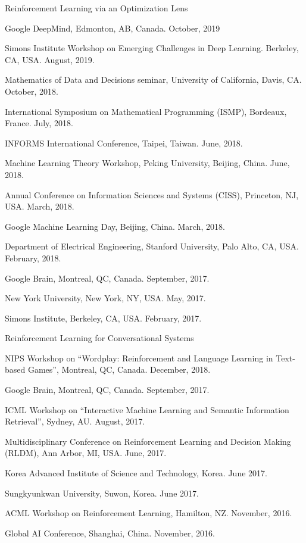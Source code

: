 \documentclass[10pt,twoside,letterpaper]{article}
\begin{document}
\begin{compactitem}

\item{ Reinforcement Learning via an Optimization Lens}
\begin{compactitem}
\item{Google DeepMind, Edmonton, AB, Canada.  October, 2019}
\item{Simons Institute Workshop on Emerging Challenges in Deep Learning.  Berkeley, CA, USA.  August, 2019.}
\item{Mathematics of Data and Decisions seminar, University of California, Davis, CA.  October, 2018.}
\item{International Symposium on Mathematical Programming (ISMP), Bordeaux, France. July, 2018.}
\item{INFORMS International Conference, Taipei, Taiwan. June, 2018.}
\item{Machine Learning Theory Workshop, Peking University, Beijing, China.  June, 2018.}
\item{Annual Conference on Information Sciences and Systems (CISS), Princeton, NJ, USA. March, 2018.}
\item{Google Machine Learning Day, Beijing, China. March, 2018.}
\item{Department of Electrical Engineering, Stanford University, Palo Alto, CA, USA. February, 2018.}
\item{Google Brain, Montreal, QC, Canada.  September, 2017.}
\item{New York University, New York, NY, USA.  May, 2017.}
\item{Simons Institute, Berkeley, CA, USA.  February, 2017.}
\end{compactitem}

\item{Reinforcement Learning for Conversational Systems}
\begin{compactitem}
\item{NIPS Workshop on ``Wordplay: Reinforcement and Language Learning in Text-based Games'', Montreal, QC, Canada.  December, 2018.}
\item{Google Brain, Montreal, QC, Canada.  September, 2017.}
\item{ICML Workshop on ``Interactive Machine Learning and Semantic Information Retrieval'', Sydney, AU.  August, 2017.}
\item{Multidisciplinary Conference on Reinforcement Learning and Decision Making (RLDM), Ann Arbor, MI, USA.  June, 2017.}
\item{Korea Advanced Institute of Science and Technology, Korea. June 2017.}
\item{Sungkyunkwan University, Suwon, Korea. June 2017.}
\item{ACML Workshop on Reinforcement Learning, Hamilton, NZ.  November, 2016.}
\item{Global AI Conference, Shanghai, China.  November, 2016.}
\end{compactitem}


\end{compactitem}
\end{document}
